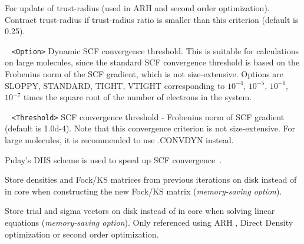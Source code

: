 \begin{description}
For update of trust-radius (used in ARH and second order optimization). Contract trust-radius
if trust-radius ratio is smaller than this criterion (default is 0.25).
\item[\Key{CONVDYN}] \verb| | \newline
\verb|<Option>|\newline 
Dynamic SCF convergence threshold. This is suitable for calculations on large molecules, since the standard SCF
convergence threshold is based on the Frobenius norm of the SCF gradient, which is not size-extensive.
Options are SLOPPY, STANDARD, TIGHT, VTIGHT corresponding to $10^{-4}$, $10^{-5}$, $10^{-6}$, $10^{-7}$ times the square root of the number of electrons in the system.
\item[\Key{CONVTHR}] \verb| | \newline
\verb|<Threshold>|\newline
SCF convergence threshold - Frobenius norm of SCF gradient (default is 1.0d-4). 
Note that this convergence criterion
is not size-extensive. For large molecules, it is recommended to use .CONVDYN instead.
\item[\Key{DIIS}] Pulay's DIIS scheme is used to speed up SCF convergence~\cite{diis1,diis2}.
\item[\Key{DISK}] Store densities and Fock/KS matrices from previous 
iterations on disk instead of in core when constructing the new Fock/KS matrix ({\it memory-saving option}).
\item[\Key{DISKSOLVER}] Store trial and sigma vectors on disk instead of in core
when solving linear equations ({\it memory-saving option}). Only referenced using ARH
, Direct Density optimization or second order optimization.

\end{description}
